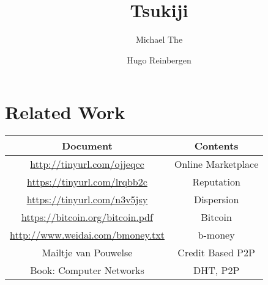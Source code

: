 \documentclass[]{article}
\title{Tsukiji}
\author{Michael The \and Hugo Reinbergen}
\begin{document}
\maketitle

\section*{Related Work}
\begin{tabular}{|c|c|}
 \hline
 Document & Contents  \\
 \hline
 \url{http://tinyurl.com/ojjeqcc} & Online Marketplace \\
 \url{https://tinyurl.com/lrqbb2c} & Reputation \\
 \url{https://tinyurl.com/n3v5jsy} & Dispersion \\
 \url{https://bitcoin.org/bitcoin.pdf} & Bitcoin \\
 \url{http://www.weidai.com/bmoney.txt} & b-money \\
 Mailtje van Pouwelse & Credit Based P2P \\
 Book: Computer Networks & DHT, P2P \\
 \hline
\end{tabular}




\tableofcontents







\end{document}
